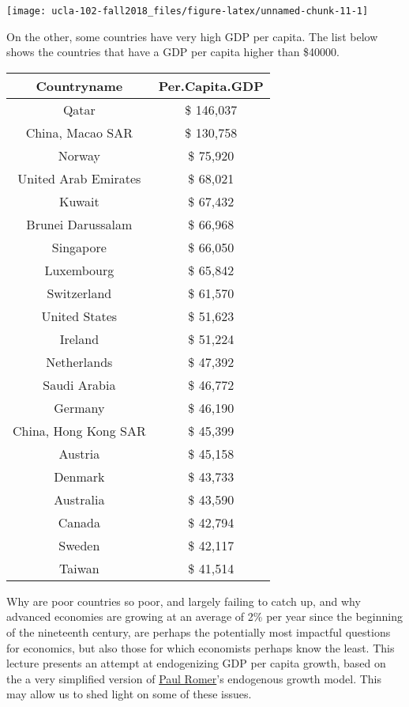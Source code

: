 \documentclass[]{book}
\theoremstyle{definition}
\theoremstyle{definition}
\theoremstyle{definition}
\theoremstyle{remark}
\begin{document}
\begin{center}\texttt{[image: ucla-102-fall2018\_files/figure-latex/unnamed-chunk-11-1]} \end{center}

On the other, some countries have very high GDP per capita. The list
below shows the countries that have a GDP per capita higher than
\$40000.

\begin{tabular}{c|c}
\hline
Countryname & Per.Capita.GDP\\
\hline
Qatar & \$ 146,037\\
\hline
China, Macao SAR & \$ 130,758\\
\hline
Norway & \$ 75,920\\
\hline
United Arab Emirates & \$ 68,021\\
\hline
Kuwait & \$ 67,432\\
\hline
Brunei Darussalam & \$ 66,968\\
\hline
Singapore & \$ 66,050\\
\hline
Luxembourg & \$ 65,842\\
\hline
Switzerland & \$ 61,570\\
\hline
United States & \$ 51,623\\
\hline
Ireland & \$ 51,224\\
\hline
Netherlands & \$ 47,392\\
\hline
Saudi Arabia & \$ 46,772\\
\hline
Germany & \$ 46,190\\
\hline
China, Hong Kong SAR & \$ 45,399\\
\hline
Austria & \$ 45,158\\
\hline
Denmark & \$ 43,733\\
\hline
Australia & \$ 43,590\\
\hline
Canada & \$ 42,794\\
\hline
Sweden & \$ 42,117\\
\hline
Taiwan & \$ 41,514\\
\hline
\end{tabular}

Why are poor countries so poor, and largely failing to catch up, and why
advanced economies are growing at an average of 2\% per year since the
beginning of the nineteenth century, are perhaps the potentially most
impactful questions for economics, but also those for which economists
perhaps know the least. This lecture presents an attempt at endogenizing
GDP per capita growth, based on the a very simplified version of
\href{https://en.wikipedia.org/wiki/Paul_Romer}{Paul Romer}'s endogenous
growth model. This may allow us to shed light on some of these issues.
\end{document}
